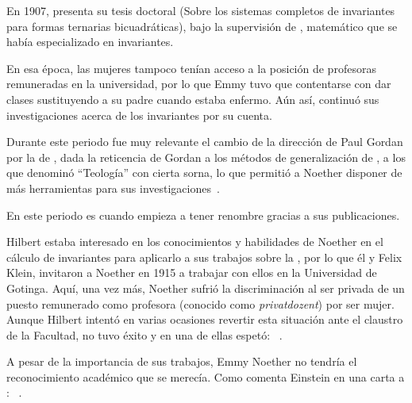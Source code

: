 En 1907, presenta su tesis doctoral  (Sobre los sistemas completos de invariantes para formas ternarias bicuadráticas), bajo la supervisión de , matemático que se había especializado en invariantes.

En esa época, las mujeres tampoco tenían acceso a la posición de profesoras remuneradas en la universidad, por lo que Emmy tuvo que contentarse con dar clases sustituyendo a su padre cuando estaba enfermo.
Aún así, continuó sus investigaciones acerca de los invariantes por su cuenta.

Durante este periodo fue muy relevante el cambio de la dirección de Paul Gordan por la de , dada la reticencia de Gordan a los métodos de generalización de , a los que denominó ``Teología'' con cierta sorna, lo que permitió a Noether disponer de más herramientas para sus investigaciones~\cite{Weyl}.

En este periodo es cuando empieza a tener renombre gracias a sus publicaciones.

Hilbert estaba interesado en los conocimientos y habilidades de Noether en el cálculo de invariantes para aplicarlo a sus trabajos sobre la ,
por lo que él y Felix Klein, invitaron a Noether en 1915 a trabajar con ellos en la Universidad de Gotinga.
Aquí, una vez más, Noether sufrió la discriminación al ser privada de un puesto remunerado como profesora (conocido como \textit{privatdozent}) por ser mujer.
Aunque Hilbert intentó en varias ocasiones revertir esta situación ante el claustro de la Facultad, no tuvo éxito y en una de ellas espetó: ~\autocite[332]{Carrasco}.

A pesar de la importancia de sus trabajos, Emmy Noether no tendría el reconocimiento académico que se merecía.
Como comenta Einstein en una carta a : ~\cite{Kimberling}.

